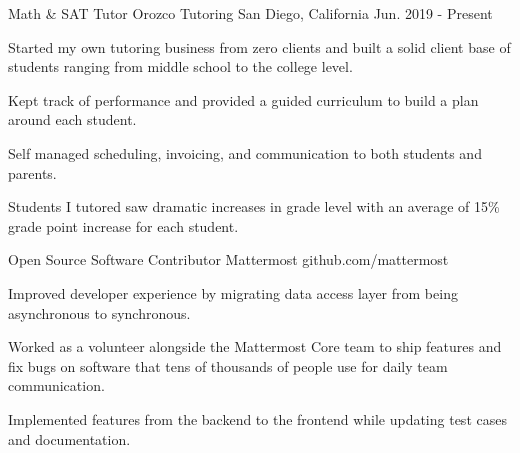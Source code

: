 

\begin{cventries}

  \cventry
    {Math \& SAT Tutor} %
    {Orozco Tutoring} %
    {San Diego, California} %
    {Jun. 2019 - Present} %
    {
      \begin{cvitems} %
        \item {Started my own tutoring business from zero clients and built a solid client base of students ranging from middle school to the college level.}
        \item {Kept track of performance and provided a guided curriculum to build a plan around each student.}
        \item {Self managed scheduling, invoicing, and communication to both students and parents.}
        \item {Students I tutored saw dramatic increases in grade level with an average of 15\% grade point increase for each student.}
      \end{cvitems}
    }

  \cventry
    {Open Source Software Contributor} %
    {Mattermost} %
    {github.com/mattermost} %
    {} %
    {
      \begin{cvitems} %
        \item {Improved developer experience by migrating data access layer from being asynchronous to synchronous.}
        \item {Worked as a volunteer alongside the Mattermost Core team to ship features and fix bugs on software that tens of thousands of people use for daily team communication.}
        \item {Implemented features from the backend to the frontend while updating test cases and documentation.}
      \end{cvitems}
    }


\end{cventries}
